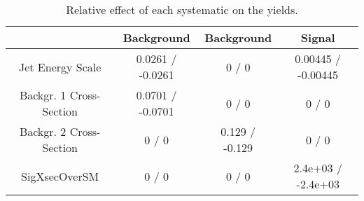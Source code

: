 \documentclass[10pt]{article}
\begin{document}
\begin{table}[htbp]
\begin{center}
\begin{tabular}{|c|c|c|c|}
\hline 
      & Background      & Background      & Signal \\ 
\hline 
  Jet Energy Scale & 0.0261 / -0.0261 & 0 / 0 & 0.00445 / -0.00445 \\ 
  Backgr. 1 Cross-Section & 0.0701 / -0.0701 & 0 / 0 & 0 / 0 \\ 
  Backgr. 2 Cross-Section & 0 / 0 & 0.129 / -0.129 & 0 / 0 \\ 
 SigXsecOverSM & 0 / 0 & 0 / 0 & 2.4e+03 / -2.4e+03 \\ 
\hline 
\end{tabular} 
\caption{Relative effect of each systematic on the yields.} 
\end{center} 
\end{table} 
\end{document}
